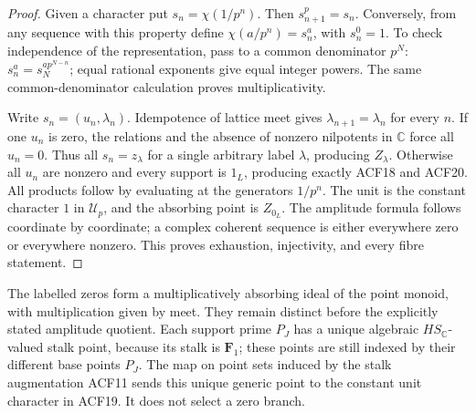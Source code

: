 \begin{proof}
Given a character put $s_n=\chi(1/p^n)$. Then $s_{n+1}^p=s_n$.
Conversely, from any sequence with this property define
$\chi(a/p^n)=s_n^a$, with $s_n^0=1$. To check independence of the
representation, pass to a common denominator $p^N$:
$s_n^a=s_N^{a p^{N-n}}$; equal rational exponents give equal integer
powers. The same common-denominator calculation proves multiplicativity.

Write $s_n=(u_n,\lambda_n)$. Idempotence of lattice meet gives
$\lambda_{n+1}=\lambda_n$ for every $n$. If one $u_n$ is zero, the
relations and the absence of nonzero nilpotents in $\mathbb C$ force
all $u_n=0$. Thus all $s_n=z_\lambda$ for a single arbitrary label
$\lambda$, producing $Z_\lambda$. Otherwise all $u_n$ are nonzero
and every support is $1_L$, producing exactly ACF18 and ACF20.
All products follow by evaluating at the generators $1/p^n$.
The unit is the constant character $1$ in $\mathcal U_p$, and the
absorbing point is $Z_{0_L}$. The amplitude formula follows coordinate
by coordinate; a complex coherent sequence is either everywhere zero
or everywhere nonzero. This proves exhaustion, injectivity, and every
fibre statement.
\end{proof}
The labelled zeros form a multiplicatively absorbing ideal of the
point monoid, with multiplication given by meet. They remain distinct
before the explicitly stated amplitude quotient. Each support prime
$P_J$ has a unique algebraic $HS_{\mathbb C}$-valued stalk point, because
its stalk is $\mathbf F_1$; these points are still indexed by their
different base points $P_J$. The map on point sets induced by the
stalk augmentation ACF11 sends this unique generic point to the
constant unit character in ACF19. It does not select a zero branch.

